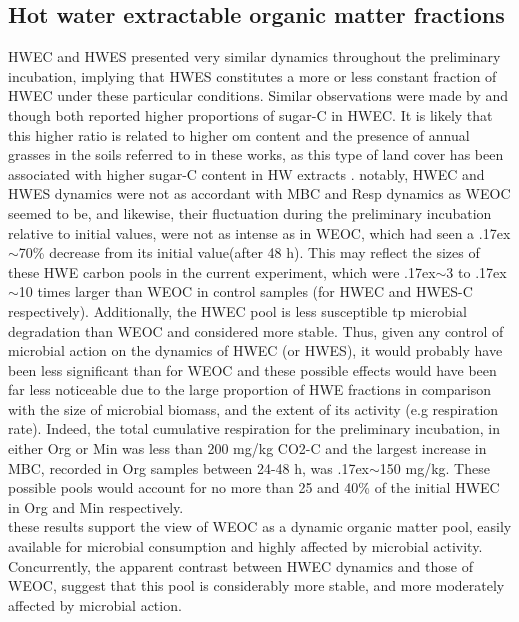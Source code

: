 	\subsection{Hot water extractable organic matter fractions}
	HWEC and HWES presented very similar dynamics throughout the preliminary incubation, implying that HWES constitutes  a more or less constant fraction of HWEC under these particular conditions. Similar observations were made by \citet{haynes2005} and \citet{ghani2000, ghani2003} though both reported higher proportions of sugar-C in HWEC. It is likely that this higher ratio is related to higher \gls{om} content and the presence of annual grasses in the soils referred to in these works, as this type of land cover has been associated with higher sugar-C content in HW extracts \citep{haynes1993}.
	notably, HWEC and HWES dynamics were not as accordant with MBC and Resp dynamics as WEOC seemed to be, and likewise, their fluctuation during the preliminary incubation relative to initial values, were not as intense as in WEOC, which had seen a {\raise.17ex\hbox{$\scriptstyle\mathtt{\sim}$}}70\% decrease from its initial value(after 48 h). This may reflect the sizes of these HWE carbon pools in the current experiment, which were {\raise.17ex\hbox{$\scriptstyle\mathtt{\sim}$}}3 to {\raise.17ex\hbox{$\scriptstyle\mathtt{\sim}$}}10 times larger than WEOC in control samples (for HWEC and HWES-C respectively). Additionally, the HWEC pool is less susceptible tp microbial degradation than WEOC and  considered more stable. Thus, given any control of microbial action on the dynamics of HWEC (or HWES), it would probably have been less significant than for WEOC and these possible effects would have been far less noticeable due to the large proportion of HWE fractions in comparison with the size of microbial biomass, and the extent of its activity (e.g respiration rate). Indeed, the total cumulative respiration  for the preliminary incubation, in either Org or Min was less than 200 mg/kg CO2-C and the largest increase in MBC, recorded in Org samples between 24-48 h, was {\raise.17ex\hbox{$\scriptstyle\mathtt{\sim}$}}150 mg/kg. These possible pools would account for no more than 25 and 40\% of the initial HWEC in Org and Min respectively. \\
	these results support the view of WEOC as a dynamic organic matter pool, easily available for microbial consumption and highly affected by microbial activity. Concurrently, the apparent contrast between HWEC dynamics and those of WEOC, suggest that this pool is considerably more stable, and more moderately affected by microbial action.\\
